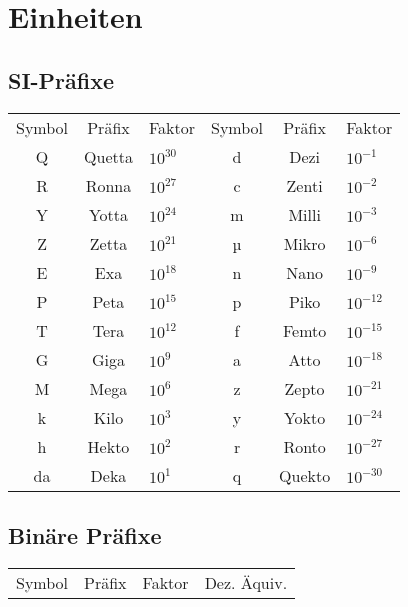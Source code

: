 \section{Einheiten}

\begin{sectionbox}
	\subsection{SI-Präfixe}
		\begin{emphbox}
			\begin{tabular}{ccl|ccl}
				Symbol & Präfix & Faktor & Symbol & Präfix & Faktor \\

				Q  & Quetta & $10^{30}$ & d & Dezi & $10^{-1}$\\
				R  & Ronna  & $10^{27}$ & c & Zenti & $10^{-2}$\\
				Y  & Yotta  & $10^{24}$ & m & Milli & $10^{-3}$\\
				Z  & Zetta  & $10^{21}$ & µ & Mikro & $10^{-6}$\\ 
				E  & Exa    & $10^{18}$ & n & Nano  & $10^{-9}$\\
				P  & Peta   & $10^{15}$ & p & Piko  & $10^{-12}$\\
				T  & Tera   & $10^{12}$ & f & Femto  & $10^{-15}$\\
			 	G  & Giga   & $10^9$    & a & Atto   & $10^{-18}$\\
				M  & Mega   & $10^6$    & z & Zepto  & $10^{-21}$\\
				k  & Kilo   & $10^3$    & y & Yokto  & $10^{-24}$\\
				h  & Hekto  & $10^2$    & r & Ronto  & $10^{-27}$\\
				da & Deka   & $10^1$    & q & Quekto & $10^{-30}$\\
			\end{tabular}
		\end{emphbox}

	\subsection{Binäre Präfixe}
		\begin{emphbox}
			\begin{tabular}{ccll}
				Symbol & Präfix & Faktor & Dez. Äquiv. \\
			

\end{tabular}
\end{emphbox}
\end{sectionbox}
